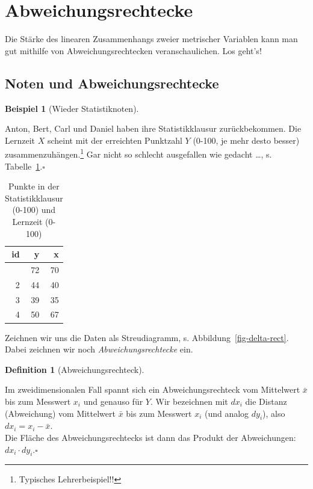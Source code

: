 \documentclass[
  letterpaper,
]{scrbook}
\theoremstyle{definition}
\newtheorem{example}{Beispiel}[chapter]
\theoremstyle{definition}
\newtheorem{definition}{Definition}[chapter]
\theoremstyle{definition}
\theoremstyle{remark}
\begin{document}
\section{Abweichungsrechtecke}\label{sec-cov}

Die Stärke des linearen Zusammenhangs zweier metrischer Variablen kann
man gut mithilfe von Abweichungsrechtecken veranschaulichen. Los geht's!

\subsection{Noten und
Abweichungsrechtecke}\label{noten-und-abweichungsrechtecke}

\begin{example}[Wieder
Statistiknoten]\protect\hypertarget{exm-noten2}{}\label{exm-noten2}

Anton, Bert, Carl und Daniel haben ihre Statistikklausur zurückbekommen.
Die Lernzeit \(X\) scheint mit der erreichten Punktzahl \(Y\) (0-100, je
mehr desto besser) zusammenzuhängen.\footnote{ Typisches
  Lehrerbeispiel!!} Gar nicht so schlecht ausgefallen wie gedacht
\ldots, s. Tabelle~\ref{tbl-noten2}.\(\square\)

\end{example}

\begin{longtable}[]{@{}rrr@{}}

\caption{\label{tbl-noten2}Punkte in der Statistikklausur (0-100) und
Lernzeit (0-100)}

\tabularnewline

\toprule\noalign{}
id & y & x \\
\midrule\noalign{}
\endhead
\bottomrule\noalign{}
\endlastfoot
1 & 72 & 70 \\
2 & 44 & 40 \\
3 & 39 & 35 \\
4 & 50 & 67 \\

\end{longtable}

Zeichnen wir uns die Daten als Streudiagramm, s.
Abbildung~\ref{fig-delta-rect}. Dabei zeichnen wir noch
\emph{Abweichungsrechtecke} ein.

\begin{definition}[Abweichungsrechteck]\protect\hypertarget{def-abweichungsrechteck}{}\label{def-abweichungsrechteck}

Im zweidimensionalen Fall spannt sich ein Abweichungsrechteck vom
Mittelwert \(\bar{x}\) bis zum Messwert \(x_i\) und genauso für \(Y\).
Wir bezeichnen mit \(dx_i\) die Distanz (Abweichung) vom Mittelwert
\(\bar{x}\) bis zum Messwert \(x_i\) (und analog \(dy_i\)), also
\(dx_i = x_i - \bar{x}\).\\
Die Fläche des Abweichungsrechtecks ist dann das Produkt der
Abweichungen: \(dx_i \cdot dy_i\).\(\square\)

\end{definition}
\end{document}
